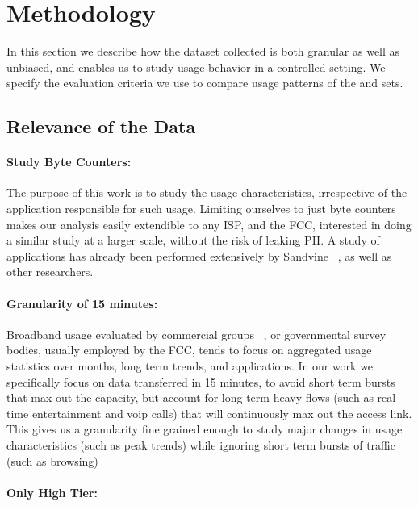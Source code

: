 \section{Methodology}
\label{sec:methodology}

In this section we describe how the dataset collected is both granular as well as unbiased, and enables us to study usage behavior in a controlled setting. We specify the evaluation criteria we use to compare usage patterns of the \test and \control sets.

\subsection{Relevance of the Data}

\paragraph{Study Byte Counters:} The purpose of this work is to study the usage characteristics, irrespective of the application responsible for such usage. 
Limiting ourselves to just byte counters makes our analysis easily extendible to any ISP, and the FCC, interested in doing a similar study at a larger scale, without the risk of leaking PII. A study of applications has already been performed extensively by Sandvine ~\cite{}, as well as other researchers.

\paragraph{Granularity of 15 minutes:} Broadband usage evaluated by commercial groups ~\cite{}, or governmental survey bodies, usually employed by the FCC, tends to focus on aggregated usage statistics over months, long term trends, and applications. In our work we specifically focus on data transferred in 15 minutes, to avoid short term bursts that max out the capacity, but account for long term heavy flows (such as real time entertainment and voip calls) that will continuously max out the access link. This gives us a granularity fine grained enough to study major changes in usage characteristics (such as peak trends) while ignoring short term bursts of traffic (such as browsing)


\paragraph{Only High Tier:}

